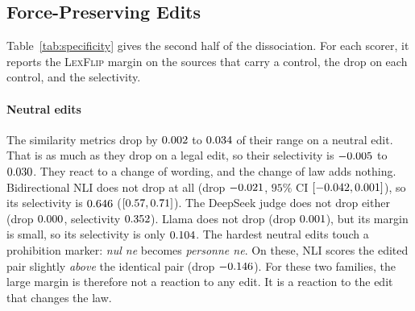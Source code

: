 \documentclass{BVP_JCLLT}
\newcommand{\rev}[1]{#1}
\newcommand{\rev}[1]{{\color{revcol}#1}}
\begin{document}
\begin{table}
\centering
\caption{\rev{\textsc{LexFlip} margin by rule and scorer family, with tiers
marked. \emph{Similarity} is the mean margin of the seven embedding and
BERTScore metrics (their range in the last row). \emph{NLI-bi} is
bidirectional NLI, and the judge columns use the headline configuration. A
margin of $1$ would mean the scorer treats the edited sentence as it treats an
unrelated one.}}\label{tab:rules}
\small
\rev{\resizebox{\columnwidth}{!}{}}
\end{table}

\rev{\subsection{Force-Preserving Edits}\label{sec:specificity}

Table~\ref{tab:specificity} gives the second half of the dissociation. For each
scorer, it reports the \textsc{LexFlip} margin on the sources that carry a
control, the drop on each control, and the selectivity.

\paragraph{Neutral edits}
The similarity metrics drop by $0.002$ to $0.034$ of
their range on a neutral edit. That is as much as they drop on a legal edit, so
their selectivity is $-0.005$ to $0.030$. They react to a
change of wording, and the change of law adds nothing. Bidirectional NLI does
not drop at all (drop $-0.021$, $95\%$ CI $[-0.042,
0.001]$), so its selectivity is $0.646$
($[0.57, 0.71]$). The DeepSeek judge does not drop
either (drop $0.000$, selectivity $0.352$). Llama does
not drop (drop $0.001$), but its margin is small, so its selectivity
is only $0.104$. The hardest
neutral edits touch a prohibition marker: \emph{nul ne} becomes \emph{personne
ne}. On these, NLI scores the edited pair slightly \emph{above} the identical
pair (drop $-0.146$). For these two families, the large margin is therefore
not a reaction to any edit. It is a reaction to the edit that changes the law.

}
\end{document}
